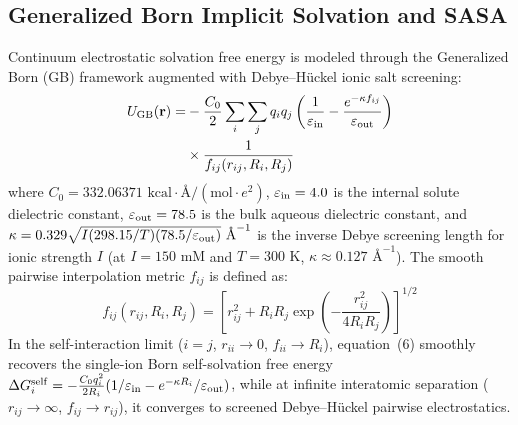 \documentclass[journal=jpcbfk,manuscript=article,layout=twocolumn]{achemso}
\begin{document}
\subsection{Generalized Born Implicit Solvation and SASA}
Continuum electrostatic solvation free energy is modeled through the Generalized Born (GB) framework augmented with Debye--H\"uckel ionic salt screening:\cite{still1990semianalytical,onufriev2004exploring}
\begin{align}
U_{\rm GB}(\mathbf{r}) = &- \frac{C_0}{2} \sum_{i} \sum_{j} q_i q_j \left( \frac{1}{\varepsilon_{\rm in}} - \frac{e^{-\kappa f_{ij}}}{\varepsilon_{\rm out}} \right) \nonumber \\
&\times \frac{1}{f_{ij}(r_{ij}, R_i, R_j)}
\end{align}
where $C_0 = 332.06371\text{ kcal}\cdot\text{\AA}/(\text{mol}\cdot e^2)$, $\varepsilon_{\rm in} = 4.0$ is the internal solute dielectric constant, $\varepsilon_{\rm out} = 78.5$ is the bulk aqueous dielectric constant, and $\kappa = 0.329 \sqrt{I (298.15/T)(78.5/\varepsilon_{\rm out})}\text{ \AA}^{-1}$ is the inverse Debye screening length for ionic strength $I$ (at $I = 150\text{ mM}$ and $T = 300\text{ K}$, $\kappa \approx 0.127\text{ \AA}^{-1}$). The smooth pairwise interpolation metric $f_{ij}$ is defined as:
\begin{equation}
f_{ij}(r_{ij}, R_i, R_j) = \left[ r_{ij}^2 + R_i R_j \exp\left( -\frac{r_{ij}^2}{4 R_i R_j} \right) \right]^{1/2}
\end{equation}
In the self-interaction limit ($i = j$, $r_{ii} \to 0$, $f_{ii} \to R_i$), equation~(6) smoothly recovers the single-ion Born self-solvation free energy $\Delta G_i^{\rm self} = -\frac{C_0 q_i^2}{2 R_i} (1/\varepsilon_{\rm in} - e^{-\kappa R_i}/\varepsilon_{\rm out})$, while at infinite interatomic separation ($r_{ij} \to \infty$, $f_{ij} \to r_{ij}$), it converges to screened Debye--H\"uckel pairwise electrostatics.
\end{document}
